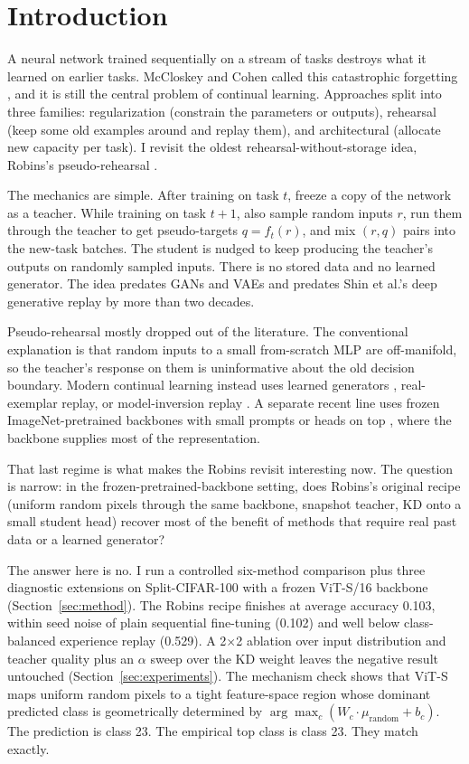 \documentclass[conference]{IEEEtran}
\begin{document}
\section{Introduction}

A neural network trained sequentially on a stream of tasks destroys what it
learned on earlier tasks. McCloskey and Cohen called this catastrophic
forgetting \citep{mccloskey1989catastrophic}, and it is still the central
problem of continual learning. Approaches split into three families:
regularization (constrain the parameters or outputs), rehearsal (keep some
old examples around and replay them), and architectural (allocate new
capacity per task). I revisit the oldest rehearsal-without-storage idea,
Robins's pseudo-rehearsal \citep{robins1995pseudorehearsal}.

The mechanics are simple. After training on task $t$, freeze a copy of the
network as a teacher. While training on task $t+1$, also sample random
inputs $r$, run them through the teacher to get pseudo-targets $q = f_t(r)$,
and mix $(r, q)$ pairs into the new-task batches. The student is nudged to
keep producing the teacher's outputs on randomly sampled inputs. There is
no stored data and no learned generator. The idea predates GANs and VAEs
and predates Shin et al.'s deep generative replay
\citep{shin2017dgr} by more than two decades.

Pseudo-rehearsal mostly dropped out of the literature. The conventional
explanation is that random inputs to a small from-scratch MLP are
off-manifold, so the teacher's response on them is uninformative about the
old decision boundary. Modern continual learning instead uses learned
generators \citep{shin2017dgr, buzzega2020der}, real-exemplar replay, or
model-inversion replay \citep{yin2020deepinversion, smith2021abd}. A
separate recent line uses frozen ImageNet-pretrained backbones with small
prompts or heads on top \citep{wang2022l2p}, where the backbone supplies
most of the representation.

That last regime is what makes the Robins revisit interesting now. The
question is narrow: in the frozen-pretrained-backbone setting, does
Robins's original recipe (uniform random pixels through the same backbone,
snapshot teacher, KD onto a small student head) recover most of the benefit
of methods that require real past data or a learned generator?

The answer here is no. I run a controlled six-method comparison plus three
diagnostic extensions on Split-CIFAR-100 with a frozen ViT-S/16 backbone
(Section~\ref{sec:method}). The Robins recipe finishes at average accuracy
0.103, within seed noise of plain sequential fine-tuning (0.102) and well
below class-balanced experience replay (0.529). A 2$\times$2 ablation over
input distribution and teacher quality plus an $\alpha$ sweep over the KD
weight leaves the negative result untouched
(Section~\ref{sec:experiments}). The mechanism check shows that ViT-S
maps uniform random pixels to a tight feature-space region whose dominant
predicted class is geometrically determined by
$\arg\max_c (W_c \cdot \mu_{\text{random}} + b_c)$. The prediction
is class 23. The empirical top class is class 23. They match exactly.
\end{document}
